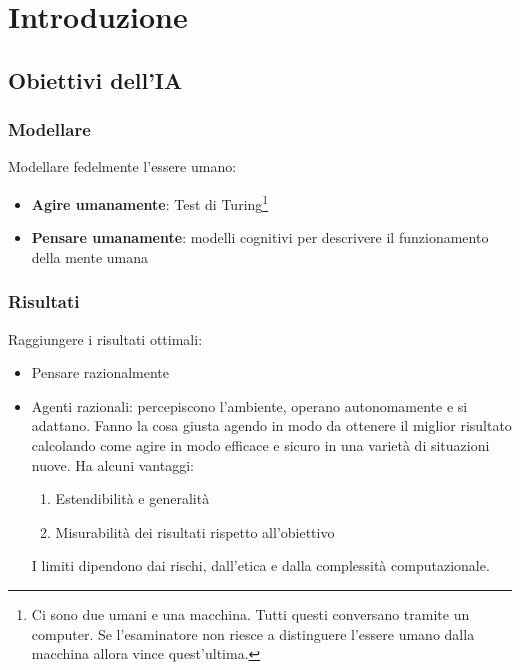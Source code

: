 \newpage
\section{Introduzione}
\subsection{Obiettivi dell'IA}
\subsubsection{Modellare}
Modellare fedelmente l'essere umano:
\begin{itemize}
	\item \textbf{Agire umanamente}: Test di Turing\footnote{Ci sono due umani e una macchina. Tutti questi conversano tramite un computer. Se l'esaminatore non riesce a distinguere l'essere umano dalla macchina allora vince quest'ultima.}
	\item \textbf{Pensare umanamente}: modelli cognitivi per descrivere il funzionamento della mente umana
\end{itemize}
\subsubsection{Risultati}
Raggiungere i risultati ottimali:
\begin{itemize}
	\item Pensare razionalmente
	\item Agenti razionali: percepiscono l'ambiente, operano autonomamente e si adattano. Fanno la cosa giusta agendo in modo da ottenere il miglior risultato calcolando come agire in modo efficace e sicuro in una varietà di situazioni nuove. Ha alcuni vantaggi:
	\begin{enumerate}
		\item Estendibilità e generalità
		\item Misurabilità dei risultati rispetto all'obiettivo
	\end{enumerate}
	I limiti dipendono dai rischi, dall'etica e dalla complessità computazionale.
\end{itemize}

